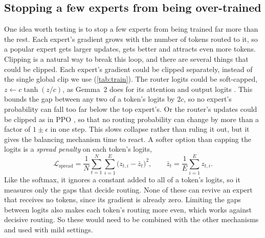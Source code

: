 \documentclass[10pt]{article}
\theoremstyle{definition}
\theoremstyle{remark}
\begin{document}
\subsection{Stopping a few experts from being over-trained}
\label{sec:clipping}
One idea worth testing is to stop a few experts from being trained far more than the rest. Each expert's gradient grows with the number of tokens routed to it, so a popular expert gets larger updates, gets better and attracts even more tokens. Clipping is a natural way to break this loop, and there are several things that could be clipped. Each expert's gradient could be clipped separately, instead of the single global clip we use (\cref{tab:train}). The router logits could be soft-capped, $z\leftarrow c\tanh(z/c)$, as Gemma~2 does for its attention and output logits \citep{gemmateam2024gemma2}. This bounds the gap between any two of a token's logits by $2c$, so no expert's probability can fall too far below the top expert's. Or the router's updates could be clipped as in PPO \citep{schulman2017ppo}, so that no routing probability can change by more than a factor of $1\pm\epsilon$ in one step. This slows collapse rather than ruling it out, but it gives the balancing mechanism time to react. A softer option than capping the logits is a \emph{spread penalty} on each token's logits,
\begin{equation}
  \mathcal{L}_{\text{spread}} = \frac{1}{N}\sum_{t=1}^N\sum_{i=1}^E\bigl(z_{t,i}-\bar z_t\bigr)^2, \qquad \bar z_t = \frac{1}{E}\sum_{i=1}^E z_{t,i}.
\end{equation}
Like the softmax, it ignores a constant added to all of a token's logits, so it measures only the gaps that decide routing. None of these can revive an expert that receives no tokens, since its gradient is already zero. Limiting the gaps between logits also makes each token's routing more even, which works against decisive routing. So these would need to be combined with the other mechanisms and used with mild settings.
\end{document}
